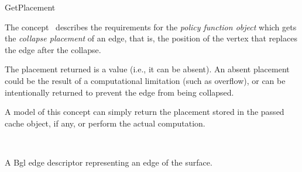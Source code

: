 
\begin{ccRefConcept}{GetPlacement}


\ccDefinition

The concept \ccRefName\ describes the requirements for the {\em policy
function object} which gets the {\em collapse placement} of an edge,
that is, the position of the vertex that replaces the edge after the
collapse.

The placement returned is a  value (i.e., it can
be absent). An absent placement could be the result of a
computational limitation (such as overflow), or can be intentionally
returned to prevent the edge from being collapsed.

A model of this concept can simply return the placement stored in the
passed cache object, if any, or perform the actual computation.

\ccRefines
{}\\

\ccTypes
\ccGlue    
\ccGlue    
\ccGlue    
  {A {\sc Bgl} edge descriptor representing an edge of the surface.}
\ccGlue    

\ccCreation
{}  %


\end{ccRefConcept}
